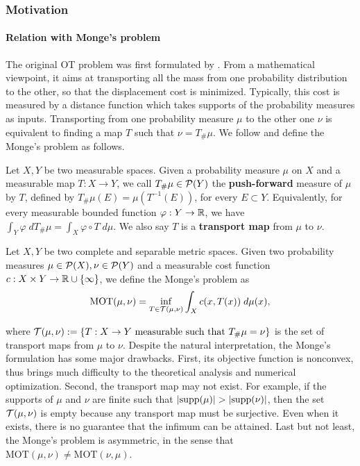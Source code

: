 \subsubsection{Motivation} \label{subsec:ot_motiv}

\paragraph{Relation with Monge's problem}
The original OT problem was first formulated by \citet{Monge81}.
From a mathematical viewpoint,
it aims at transporting all the mass from one probability distribution to the other, so that
the displacement cost is minimized. Typically, this cost is measured by a distance function which
takes supports of the probability measures as inputs. Transporting from one probability measure
$\mu$ to the other one $\nu$ is equivalent to finding a map $T$ such that $\nu = T_{\#} \mu$.
We follow \citet{Fillipo15} and define the Monge's problem as follows.
\begin{definition}
  Let $X, Y$ be two measurable spaces. Given a probability measure $\mu$ on $X$ and a
  measurable map $T: X \to Y$, we call $T_{\#} \mu \in \mathcal P(Y)$ the \textbf{push-forward} measure of
  $\mu$ by $T$, defined by $T_{\#} \mu(E) = \mu(T^{-1}(E))$, for every $E \subset Y$. Equivalently,
  for every measurable bounded function $\varphi: Y \to \mathbb R$, we have
  $\int_Y \varphi \; d T_{\#} \mu = \int_X \varphi \circ T \; d\mu$.
  We also say $T$ is a \textbf{transport map} from $\mu$ to $\nu$.
\end{definition}
\begin{definition}
  Let $X, Y$ be two complete and separable metric spaces.
  Given two probability measures $\mu \in \mathcal P(X), \nu \in \mathcal P(Y)$
  and a measurable cost function $c: X \times Y \to \mathbb R \cup \{\infty\}$,
  we define the Monge's problem as
  \begin{align}
    \text{MOT}(\mu, \nu) = \inf_{T \in \mathcal T(\mu, \nu)} \int_X c(x, T(x)) \; d\mu(x),
  \end{align}
\end{definition}
where $\mathcal T(\mu, \nu) := \{T: X \to Y \text{ measurable such that } T_{\#} \mu= \nu \}$ is the
set of transport maps from $\mu$ to $\nu$.
Despite the natural interpretation, the Monge's formulation has some major drawbacks.
First, its objective function is nonconvex,
thus brings much difficulty to the theoretical analysis and numerical optimization.
Second, the transport map may not exist.
For example, if the supports of $\mu$ and $\nu$ are finite such that $|\text{supp}(\mu)| > |\text{supp}(\nu)|$,
then the set $\mathcal T(\mu, \nu)$ is empty because any transport map must be surjective.
Even when it exists, there is no guarantee that the infimum can be attained.
Last but not least, the Monge's problem is asymmetric,
in the sense that $\text{MOT}(\mu, \nu) \neq \text{MOT}(\nu, \mu)$.

